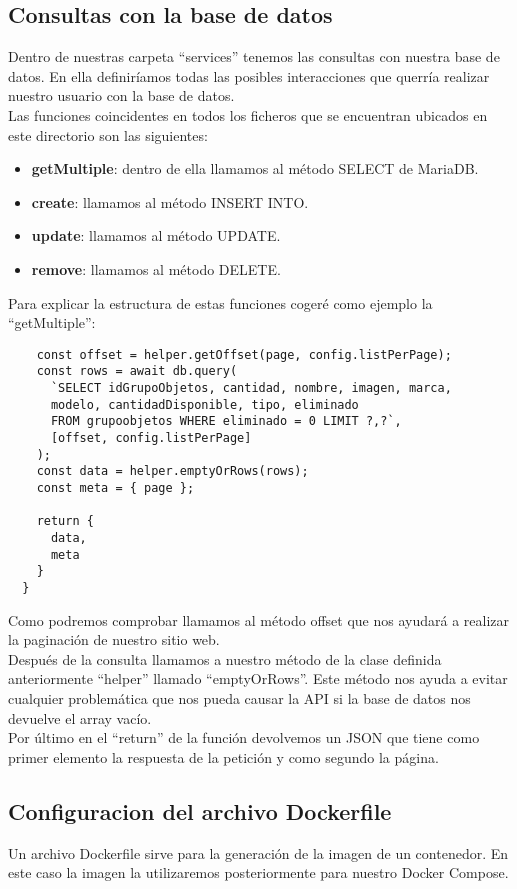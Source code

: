 \subsection{Consultas con la base de datos}
Dentro de nuestras carpeta ``services'' tenemos las consultas con nuestra base de datos. En ella definiríamos todas las posibles interacciones que querría realizar nuestro usuario con la base de datos.
\\Las funciones coincidentes en todos los ficheros que se encuentran ubicados en este directorio son las siguientes:
\begin{itemize}
    \item \textbf{getMultiple}: dentro de ella llamamos al método SELECT de MariaDB.
    \item \textbf{create}: llamamos al método INSERT INTO.
    \item \textbf{update}: llamamos al método UPDATE.
    \item \textbf{remove}: llamamos al método DELETE.
\end{itemize}
Para explicar la estructura de estas funciones cogeré como ejemplo la ``getMultiple'':
\begin{verbatim}
    const offset = helper.getOffset(page, config.listPerPage);
    const rows = await db.query(
      `SELECT idGrupoObjetos, cantidad, nombre, imagen, marca, 
      modelo, cantidadDisponible, tipo, eliminado 
      FROM grupoobjetos WHERE eliminado = 0 LIMIT ?,?`,
      [offset, config.listPerPage]
    );
    const data = helper.emptyOrRows(rows);
    const meta = { page };
  
    return {
      data,
      meta
    }
  }
\end{verbatim}
Como podremos comprobar llamamos al método offset que nos ayudará a realizar la paginación de nuestro sitio web.
\\Después de la consulta llamamos a nuestro método de la clase definida anteriormente ``helper'' llamado ``emptyOrRows''. Este método nos ayuda a evitar cualquier problemática que nos pueda causar la API si la base de datos nos devuelve el array vacío.
\\Por último en el ``return'' de la función devolvemos un JSON que tiene como primer elemento la respuesta de la petición y como segundo la página.

\subsection{Configuracion del archivo Dockerfile}
Un archivo Dockerfile sirve para la generación de la imagen de un contenedor. En este caso la imagen la utilizaremos posteriormente para nuestro Docker Compose.

